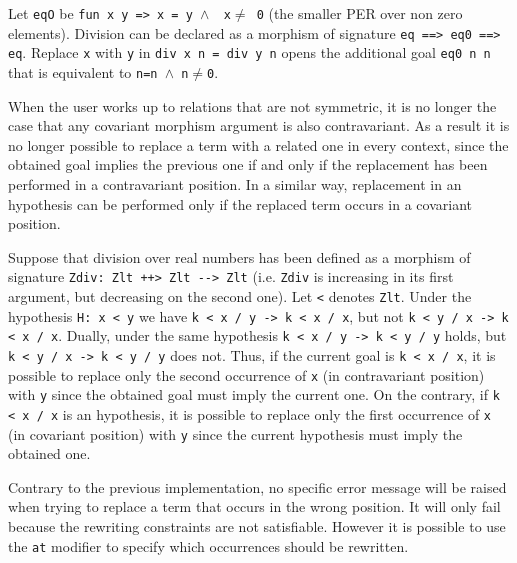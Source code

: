 \begin{cscexample}
Let \texttt{eqO} be \texttt{fun x y => x = y $\land$ ~x$\neq$ 0} (the smaller PER over
non zero elements). Division can be declared as a morphism of signature
\texttt{eq ==> eq0 ==> eq}. Replace \texttt{x} with \texttt{y} in
\texttt{div x n = div y n} opens the additional goal \texttt{eq0 n n} that
is equivalent to \texttt{n=n $\land$ n$\neq$0}.
\end{cscexample}

When the user works up to relations that are not symmetric, it is no longer
the case that any covariant morphism argument is also contravariant. As a
result it is no longer possible to replace a term with a related one in
every context, since the obtained goal implies the previous one if and
only if the replacement has been performed in a contravariant position.
In a similar way, replacement in an hypothesis can be performed only if
the replaced term occurs in a covariant position.

\begin{cscexample}
Suppose that division over real numbers has been defined as a
morphism of signature \texttt{Zdiv: Zlt ++> Zlt -{}-> Zlt} (i.e.
\texttt{Zdiv} is increasing in its first argument, but decreasing on the
second one). Let \texttt{<} denotes \texttt{Zlt}. 
Under the hypothesis \texttt{H: x < y} we have
\texttt{k < x / y -> k < x / x}, but not
\texttt{k < y / x -> k < x / x}.
Dually, under the same hypothesis \texttt{k < x / y -> k < y / y} holds,
but \texttt{k < y / x -> k < y / y} does not.
Thus, if the current goal is \texttt{k < x / x}, it is possible to replace
only the second occurrence of \texttt{x} (in contravariant position)
with \texttt{y} since the obtained goal must imply the current one.
On the contrary, if \texttt{k < x / x} is
an hypothesis, it is possible to replace only the first occurrence of
\texttt{x} (in covariant position) with \texttt{y} since
the current hypothesis must imply the obtained one.
\end{cscexample}

Contrary to the previous implementation, no specific error message will
be raised when trying to replace a term that occurs in the wrong
position. It will only fail because the rewriting constraints are not
satisfiable. However it is possible to use the \texttt{at} modifier to
specify which occurrences should be rewritten.

